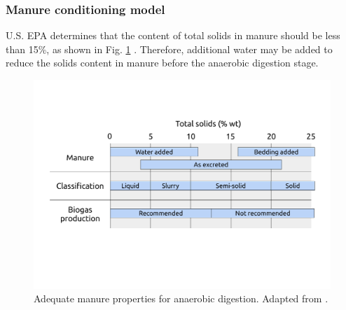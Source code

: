 \documentclass[10pt,a4paper]{article}
\begin{document}
\subsubsection{Manure conditioning model}
U.S. EPA determines that the content of total solids in manure should be less than 15\%, as shown in Fig. \ref{fig:TS_max} . Therefore, additional water may be added to reduce the solids content in manure before the anaerobic digestion stage.
\begin{figure}[H]
	\centering
	\includegraphics[width=0.7\linewidth, trim=1cm 4cm 1cm 2.5cm, clip]{water_manure_properties} 
	\caption{Adequate manure properties for anaerobic digestion. Adapted from \protect{}.}
	\label{fig:TS_max}
\end{figure}
\end{document}
